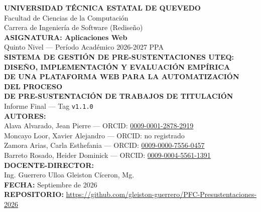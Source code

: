 \begin{titlepage}
\centering
\vspace*{0.4cm}
{\LARGE \textbf{UNIVERSIDAD TÉCNICA ESTATAL DE QUEVEDO}}\\[0.3cm]
{\large Facultad de Ciencias de la Computación}\\[0.2cm]
{\large Carrera de Ingeniería de Software (Rediseño)}\\[0.5cm]

{\large \textbf{ASIGNATURA: Aplicaciones Web}}\\[0.3cm]
{\large Quinto Nivel --- Período Académico 2026-2027 PPA}\\[0.7cm]

{\Large \textbf{SISTEMA DE GESTIÓN DE PRE-SUSTENTACIONES UTEQ:}}\\[0.2cm]
{\Large \textbf{DISEÑO, IMPLEMENTACIÓN Y EVALUACIÓN EMPÍRICA}}\\[0.3cm]
{\large \textbf{DE UNA PLATAFORMA WEB PARA LA AUTOMATIZACIÓN DEL PROCESO}}\\[0.1cm]
{\large \textbf{DE PRE-SUSTENTACIÓN DE TRABAJOS DE TITULACIÓN}}\\[0.6cm]

{\large Informe Final --- Tag \texttt{v1.1.0}}\\[0.8cm]

\vfill
{\large \textbf{AUTORES:}}\\[0.4cm]
{\large Alava Alvarado, Jean Pierre \quad --- \quad ORCID: \href{https://orcid.org/0009-0001-2878-2919}{0009-0001-2878-2919}}\\[0.15cm]
{\large Moncayo Loor, Xavier Alejandro \quad --- \quad ORCID: no registrado}\\[0.15cm]
{\large Zamora Arias, Carla Esthefania \quad --- \quad ORCID: \href{https://orcid.org/0009-0000-7556-0457}{0009-0000-7556-0457}}\\[0.15cm]
{\large Barreto Rosado, Heider Dominick \quad --- \quad ORCID: \href{https://orcid.org/0009-0004-5561-1391}{0009-0004-5561-1391}}\\[0.6cm]

{\large \textbf{DOCENTE-DIRECTOR:}}\\[0.3cm]
{\large Ing. Guerrero Ulloa Gleiston Cíceron, Mg.}\\[0.6cm]

{\large \textbf{FECHA:} Septiembre de 2026}\\[0.4cm]

{\large \textbf{REPOSITORIO:} \url{https://github.com/gleiston-guerrero/PFC-Presustentaciones-2026}}
\vspace*{0.3cm}
\end{titlepage}
